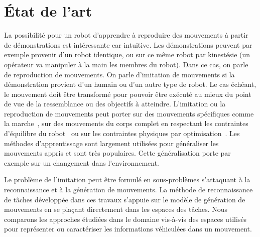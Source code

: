 \section{État de l'art}
\label{chap:eda}
La possibilité pour un robot d'apprendre à reproduire des mouvements à 
partir de démonstrations est intéressante car intuitive. 
Les démonstrations peuvent par exemple provenir d'un robot identique, ou sur ce même
robot par kinestésie (un opérateur va manipuler à la main les membres du robot).
Dans ce cas, on parle de reproduction de mouvements.
On parle d'imitation de mouvements si la démonstration provient d'un humain ou d'un autre type de robot. 
Le cas échéant, le mouvement doit être transformé pour pouvoir être exécuté au mieux
du point de vue de la ressemblance ou des objectifs à atteindre.
L'imitation ou la reproduction de mouvements peut porter sur des mouvements spécifiques comme
la marche~\cite{benallegue10}, sur des mouvements du corps complet en 
respectant les contraintes d'équilibre du robot~\cite{nakaoka03, yamane09a, miura09} ou 
sur les contraintes physiques par optimisation~\cite{suleiman08}.
Les méthodes d'apprentissage
sont largement utilisées pour généraliser les mouvements appris et sont très populaires.
Cette généralisation porte par exemple sur un changement dans l'environnement.

Le problème de l'imitation
peut être formulé en sous-problèmes
s'attaquant à la reconnaissance et à la génération de mouvements.
La méthode de reconnaissance de t\^aches développée dans ces travaux
s'appuie sur le modèle de génération de mouvements en se
plaçant directement dans les espaces des t\^aches.
Nous comparons les approches étudiées dans le domaine vis-à-vis des espaces utilisés pour
représenter ou caractériser les informations véhiculées dans un mouvement.
